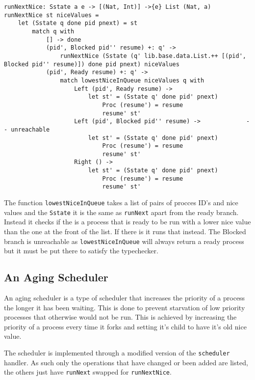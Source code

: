 \documentclass[logo,bsc,singlespacing,parskip]{infthesis}
\begin{document}
\begin{lstlisting}[language=unison]
runNextNice: Sstate a e -> [(Nat, Int)] ->{e} List (Nat, a)
runNextNice st niceValues = 
    let (Sstate q done pid pnext) = st
        match q with
            [] -> done
            (pid', Blocked pid'' resume) +: q' -> 
                runNextNice (Sstate (q' lib.base.data.List.++ [(pid', Blocked pid'' resume)]) done pid pnext) niceValues
            (pid', Ready resume) +: q' ->
                match lowestNiceInQueue niceValues q with
                    Left (pid', Ready resume) -> 
                        let st' = (Sstate q' done pid' pnext)
                            Proc (resume') = resume
                            resume' st'
                    Left (pid', Blocked pid'' resume) ->             -- unreachable
                        let st' = (Sstate q' done pid' pnext)
                            Proc (resume') = resume
                            resume' st'
                    Right () -> 
                        let st' = (Sstate q' done pid' pnext)
                            Proc (resume') = resume
                            resume' st'
\end{lstlisting}

The function \texttt{lowestNiceInQueue} takes a list of pairs of procces ID's
and nice values and the \texttt{Sstate} it is the same as \texttt{runNext}
apart from the ready branch. Instead it checks if the is a process that is
ready to be run with a lower nice value than the one at the front of the list.
If there is it runs that instead. The Blocked branch is unreachable as
\texttt{lowestNiceInQueue} will always return a ready process but it must be
put there to satisfy the typechecker.

\subsection{An Aging Scheduler}

An aging scheduler is a type of scheduler that increases the priority of a
process the longer it has been waiting. This is done to prevent starvation of
low priority processes that otherwise would not be run. This is achieved by
increasing the priority of a process every time it forks and setting it's child
to have it's old nice value.

The scheduler is implemented through a modified version of the
\texttt{scheduler} handler. As such only the operations that have changed or
been added are listed, the others just have \texttt{runNext} swapped for
\texttt{runNextNice}.
\end{document}

